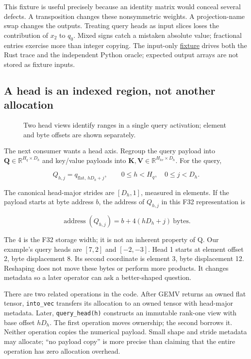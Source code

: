 \documentclass[
  10pt,
]{article}
\begin{document}
This fixture is useful precisely because an identity matrix would
conceal several defects. A transposition changes these nonsymmetric
weights. A projection-name swap changes the outputs. Treating query
heads as input slices loses the contribution of \(x_2\) to \(q_0\).
Mixed signs catch a mistaken absolute value; fractional entries exercise
more than integer copying. The input-only
\href{https://github.com/hermonai/inside-the-llm-engine/blob/astra-visual-rewrite/code/reference/fixtures/chapter08-qkv.json}{fixture}
drives both the Rust trace and the independent Python oracle; expected
output arrays are not stored as fixture inputs.

\subsection{A head is an indexed region, not another
allocation}\label{a-head-is-an-indexed-region-not-another-allocation}

\begin{figure}[H]\centering\resizebox{\linewidth}{!}{}\caption{Two head views identify ranges in a single query activation; element and byte offsets are shown separately.}\end{figure}

The next consumer wants a head axis. Regroup the query payload into
\(\mathbf{Q}\in\mathbb{R}^{H_q\times D_h}\) and key/value payloads into
\(\mathbf{K},\mathbf{V}\in\mathbb{R}^{H_{kv}\times D_h}\). For the
query,

\[
Q_{h,j}=q_{\mathrm{flat},\,hD_h+j},
\qquad 0\le h<H_q,\quad 0\le j<D_h.
\]

The canonical head-major strides are \([D_h,1]\), measured in elements.
If the payload starts at byte address \(b\), the address of \(Q_{h,j}\)
in this F32 representation is

\[
\operatorname{address}(Q_{h,j})=b+4(hD_h+j)\ \text{bytes}.
\]

The \(4\) is the F32 storage width; it is not an inherent property of Q.
Our example's query heads are \([7,2]\) and \([-2,-3]\). Head 1 starts
at element offset 2, byte displacement 8. Its second coordinate is
element 3, byte displacement 12. Reshaping does not move these bytes or
perform more products. It changes metadata so a later operator can ask a
better-shaped question.

There are two related operations in the code. After GEMV returns an
owned flat tensor, \texttt{into\_vec} transfers its allocation to an
owned tensor with head-major metadata. Later, \texttt{query\_head(h)}
constructs an immutable rank-one view with base offset \(hD_h\). The
first operation moves ownership; the second borrows it. Neither
operation copies the numerical payload. Small shape and stride metadata
may allocate; ``no payload copy'' is more precise than claiming that the
entire operation has zero allocation overhead.
\end{document}
